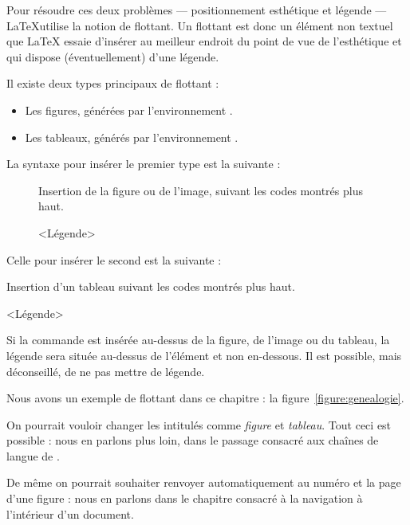Pour résoudre ces deux problèmes --- positionnement esthétique et légende --- \LaTeX utilise la notion de flottant. Un flottant est donc un élément non textuel que LaTeX essaie d'insérer au meilleur endroit du point de vue de l'esthétique et qui dispose (éventuellement) d'une légende.

Il existe deux types principaux de flottant :
\begin{itemize}
    \item Les figures, générées par l'environnement .
    \item Les tableaux, générés par l'environnement .
\end{itemize}

La syntaxe pour insérer le premier type est la suivante :

\begin{latexcode}
\begin{figure}[<paramètre de placement>]
    Insertion de la figure ou de l'image,
    suivant les codes montrés plus haut.
    \caption{<Légende>}
\end{figure} 
\end{latexcode}

Celle pour insérer le second est la suivante :

\begin{latexcode}
\begin{table}[<paramètre de placement>]
    Insertion d'un tableau suivant les codes montrés plus haut.
    \caption{<Légende>}
\end{table} 
\end{latexcode}

Si la commande  est insérée au-dessus de la figure, de l'image ou du tableau, la légende sera située au-dessus de l'élément et non en-dessous. Il est possible, mais déconseillé, de ne pas mettre de légende.

Nous avons un exemple de flottant   dans ce chapitre : la figure~\ref{figure:genealogie}.
\begin{attention}
    On pourrait vouloir changer les intitulés comme \emph{figure} et \emph{tableau}. Tout ceci est possible : nous en parlons plus loin, dans le passage consacré aux chaînes de langue de .
    
    De même on pourrait souhaiter renvoyer automatiquement au numéro et la page d'une figure : nous en parlons dans le chapitre consacré à la navigation à l'intérieur d'un document.
\end{attention}

